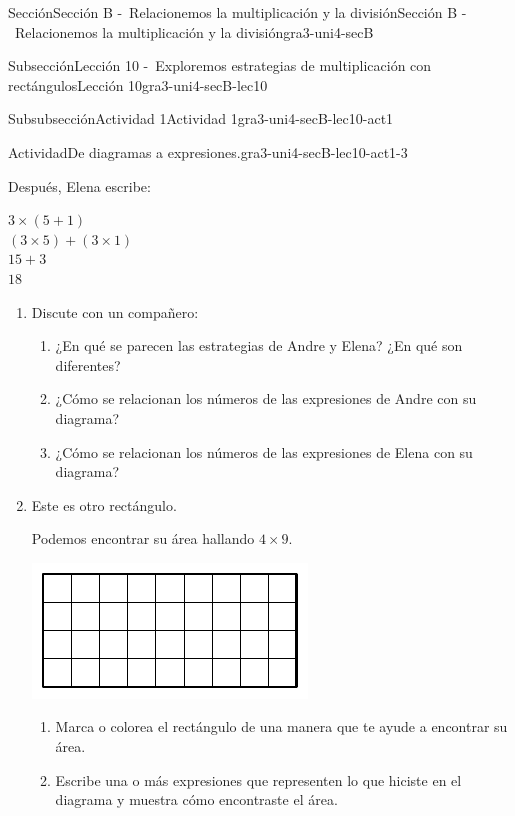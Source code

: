 \documentclass[twoside,10pt,]{article}
\begin{document}
\begin{sectionptx}{Sección}{Sección B -~Relacionemos la multiplicación y la división}{}{Sección B -~Relacionemos la multiplicación y la división}{}{}{gra3-uni4-secB}
\begin{subsectionptx}{Subsección}{Lección 10 -~Exploremos estrategias de multiplicación con rectángulos}{}{Lección 10}{}{}{gra3-uni4-secB-lec10}
\begin{subsubsectionptx}{Subsubsección}{Actividad 1}{}{Actividad 1}{}{}{gra3-uni4-secB-lec10-act1}
\begin{activity}{Actividad}{De diagramas a expresiones.}{gra3-uni4-secB-lec10-act1-3}
\begin{sidebyside}{3}{0}{0}{0.065}
\begin{sbspanel}{0.35}
\end{sbspanel}%
\begin{sbspanel}{0.25}%
Después, Elena escribe:%
\par
\(3 \times (5 + 1)\)\\
 \((3 \times 5) + (3 \times 1)\)\\
 \(15+3\)\\
 \(18\)%
\end{sbspanel}%
\end{sidebyside}%
%
\begin{enumerate}
\item{}Discute con un compañero:%
%
\begin{enumerate}
\item{}¿En qué se parecen las estrategias de Andre y Elena? ¿En qué son diferentes?%
\item{}¿Cómo se relacionan los números de las expresiones de Andre con su diagrama?%
\item{}¿Cómo se relacionan los números de las expresiones de Elena con su diagrama?%
\end{enumerate}
\item{}\begin{sidebyside}{2}{0}{0}{0}%
\begin{sbspanel}{0.5}%
Este es otro rectángulo.%
\par
Podemos encontrar su área hallando \(4 \times 9\).%
\end{sbspanel}%
\begin{sbspanel}{0.5}%
\includegraphics[width=\linewidth]{external/svg-source/tikz-file-153048.pdf}
\end{sbspanel}%
\end{sidebyside}%
%
\begin{enumerate}
\item{}Marca o colorea el rectángulo de una manera que te ayude a encontrar su área.%
\item{}Escribe una o más expresiones que representen lo que hiciste en el diagrama y muestra cómo encontraste el área.%

\end{enumerate}
\end{enumerate}
\end{activity}
\end{subsubsectionptx}
\end{subsectionptx}
\end{sectionptx}
\end{document}
